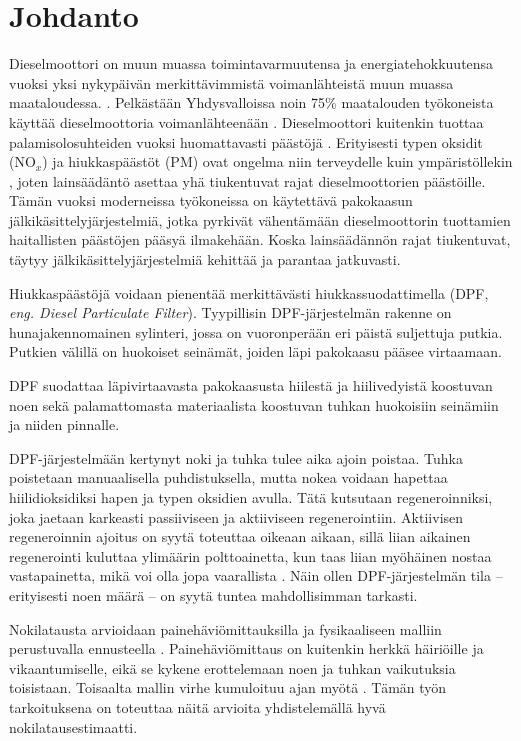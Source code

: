 \chapter{Johdanto}%
\label{ch:johdanto}
Dieselmoottori on muun muassa toimintavarmuutensa ja energiatehokkuutensa vuoksi yksi nykypäivän merkittävimmistä voimanlähteistä muun muassa maataloudessa.  
\cite[s. 121, 137-138]{Koten_2024}.
Pelkästään Yhdysvalloissa noin 75\% maatalouden työkoneista käyttää dieselmoottoria voimanlähteenään \cite[s. 122]{Koten_2024}.  
Dieselmoottori kuitenkin tuottaa palamisolosuhteiden vuoksi
huomattavasti päästöjä \cite{FiebigMichael2014Pefd}. Erityisesti typen oksidit (NO\(_x\)) ja hiukkaspäästöt (PM) ovat ongelma niin terveydelle kuin ympäristöllekin \cite[s. 138]{Koten_2024}\cite{YaoDongwei2023Rodm}, joten  lainsäädäntö asettaa yhä tiukentuvat rajat dieselmoottorien päästöille. Tämän vuoksi moderneissa työkoneissa on käytettävä pakokaasun jälkikäsittelyjärjestelmiä, jotka pyrkivät vähentämään dieselmoottorin tuottamien haitallisten päästöjen pääsyä ilmakehään. Koska lainsäädännön rajat tiukentuvat, täytyy jälkikäsittelyjärjestelmiä kehittää ja parantaa jatkuvasti.

Hiukkaspäästöjä voidaan pienentää merkittävästi hiukkassuodattimella (DPF, \emph{eng. Diesel Particulate Filter}).
Tyypillisin \cite{SHIYunxi2020Eota} DPF-järjestelmän rakenne on hunajakennomainen sylinteri, jossa on vuoronperään eri päistä suljettuja putkia. Putkien välillä on huokoiset seinämät, joiden läpi pakokaasu pääsee virtaamaan.

DPF suodattaa läpivirtaavasta pakokaasusta hiilestä ja hiilivedyistä koostuvan noen sekä palamattomasta materiaalista koostuvan tuhkan huokoisiin seinämiin ja niiden pinnalle. 

DPF-järjestelmään kertynyt noki ja tuhka tulee aika ajoin poistaa. Tuhka poistetaan manuaalisella puhdistuksella, mutta nokea voidaan hapettaa hiilidioksidiksi hapen ja typen oksidien avulla. Tätä kutsutaan regeneroinniksi, joka jaetaan karkeasti passiiviseen ja aktiiviseen regenerointiin.
Aktiivisen regeneroinnin ajoitus on syytä toteuttaa oikeaan aikaan, sillä liian aikainen regenerointi kuluttaa ylimäärin polttoainetta, kun taas liian myöhäinen nostaa vastapainetta, mikä voi olla jopa vaarallista \cite{YaoDongwei2023Rodm}. 
Näin ollen DPF-järjestelmän tila -- erityisesti noen  määrä -- on syytä tuntea mahdollisimman tarkasti. 

Nokilatausta arvioidaan painehäviömittauksilla ja fysikaaliseen malliin perustuvalla ennusteella \cite{YaoDongwei2023Rodm}. Painehäviömittaus on kuitenkin herkkä häiriöille ja vikaantumiselle, eikä se kykene erottelemaan noen ja tuhkan vaikutuksia toisistaan.
Toisaalta mallin virhe kumuloituu ajan myötä \cite{YaoDongwei2023Rodm}.
Tämän työn tarkoituksena on toteuttaa näitä arvioita yhdistelemällä hyvä nokilatausestimaatti. 

